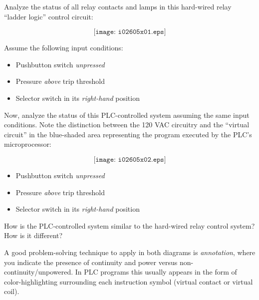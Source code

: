 

Analyze the status of all relay contacts and lamps in this hard-wired relay ``ladder logic'' control circuit:

$$\texttt{[image: i02605x01.eps]}$$

Assume the following input conditions:

\begin{itemize}
\item{} Pushbutton switch {\it unpressed}
\item{} Pressure {\it above} trip threshold
\item{} Selector switch in its {\it right-hand} position
\end{itemize}

\vfil \eject

Now, analyze the status of this PLC-controlled system assuming the same input conditions.  Note the distinction between the 120 VAC circuitry and the ``virtual circuit'' in the blue-shaded area representing the program executed by the PLC's microprocessor:

$$\texttt{[image: i02605x02.eps]}$$

\begin{itemize}
\item{} Pushbutton switch {\it unpressed}
\item{} Pressure {\it above} trip threshold
\item{} Selector switch in its {\it right-hand} position
\end{itemize}

How is the PLC-controlled system similar to the hard-wired relay control system?  How is it different?

\vskip 10pt







A good problem-solving technique to apply in both diagrams is {\it annotation}, where you indicate the presence of continuity and power versus non-continuity/unpowered.  In PLC programs this usually appears in the form of color-highlighting surrounding each instruction symbol (virtual contact or virtual coil).

